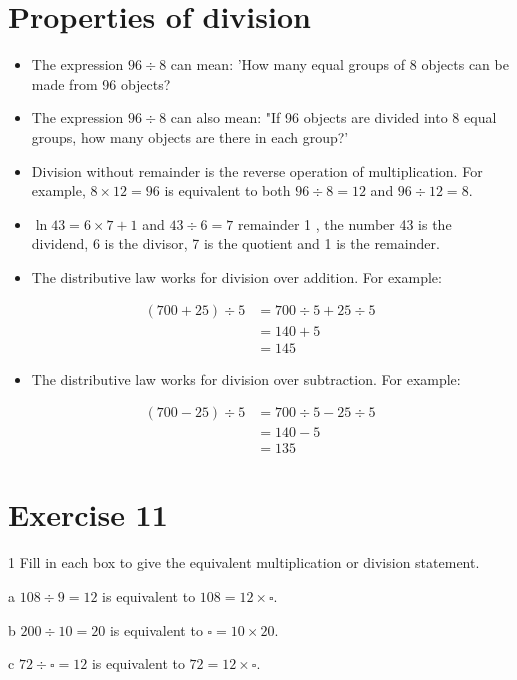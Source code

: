 \documentclass[10pt]{article}
\begin{document}
\section*{Properties of division}
\begin{itemize}
  \item The expression \(96 \div 8\) can mean: 'How many equal groups of 8 objects can be made from 96 objects?
  \item The expression \(96 \div 8\) can also mean: "If 96 objects are divided into 8 equal groups, how many objects are there in each group?'
  \item Division without remainder is the reverse operation of multiplication. For example, \(8 \times 12=96\) is equivalent to both \(96 \div 8=12\) and \(96 \div 12=8\).
  \item \(\ln 43=6 \times 7+1\) and \(43 \div 6=7\) remainder 1 , the number 43 is the dividend, 6 is the divisor, 7 is the quotient and 1 is the remainder.
  \item The distributive law works for division over addition. For example:
\end{itemize}

\[
\begin{aligned}
(700+25) \div 5 & =700 \div 5+25 \div 5 \\
& =140+5 \\
& =145
\end{aligned}
\]

\begin{itemize}
  \item The distributive law works for division over subtraction. For example:
\end{itemize}

\[
\begin{aligned}
(700-25) \div 5 & =700 \div 5-25 \div 5 \\
& =140-5 \\
& =135
\end{aligned}
\]

\section*{Exercise 11}
1 Fill in each box to give the equivalent multiplication or division statement.

a \(108 \div 9=12\) is equivalent to \(108=12 \times \square\).

b \(200 \div 10=20\) is equivalent to \(\square=10 \times 20\).

c \(72 \div \square=12\) is equivalent to \(72=12 \times \square\).
\end{document}
